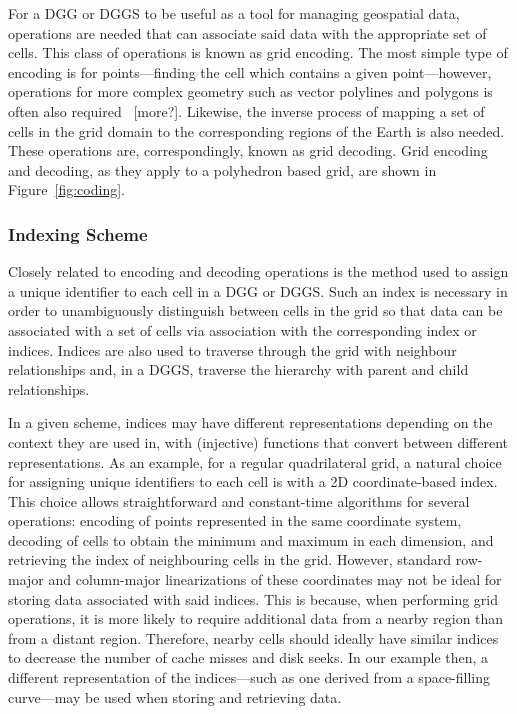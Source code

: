 For a DGG or DGGS to be useful as a tool for managing geospatial data, operations are needed that can associate said data with the appropriate set of cells.
This class of operations is known as grid encoding.
The most simple type of encoding is for points---finding the cell which contains a given point---however, operations for more complex geometry such as vector polylines and polygons is often also required~\cite{du2018duality} [more?].
Likewise, the inverse process of mapping a set of cells in the grid domain to the corresponding regions of the Earth is also needed.
These operations are, correspondingly, known as grid decoding.
Grid encoding and decoding, as they apply to a polyhedron based grid, are shown in Figure~\ref{fig:coding}.


\subsubsection{Indexing Scheme} \label{chap:2:indexing}
Closely related to encoding and decoding operations is the method used to assign a unique identifier to each cell in a DGG or DGGS.
Such an index is necessary in order to unambiguously distinguish between cells in the grid so that data can be associated with a set of cells via association with the corresponding index or indices.
Indices are also used to traverse through the grid with neighbour relationships and, in a DGGS, traverse the hierarchy with parent and child relationships.


In a given scheme, indices may have different representations depending on the context they are used in, with (injective) functions that convert between different representations.
As an example, for a regular quadrilateral grid, a natural choice for assigning unique identifiers to each cell is with a 2D coordinate-based index.
This choice allows straightforward and constant-time algorithms for several operations: encoding of points represented in the same coordinate system, decoding of cells to obtain the minimum and maximum in each dimension, and retrieving the index of neighbouring cells in the grid.
However, standard row-major and column-major linearizations of these coordinates may not be ideal for storing data associated with said indices.
This is because, when performing grid operations, it is more likely to require additional data from a nearby region than from a distant region.
Therefore, nearby cells should ideally have similar indices to decrease the number of cache misses and disk seeks.
In our example then, a different representation of the indices---such as one derived from a space-filling curve---may be used when storing and retrieving data.


